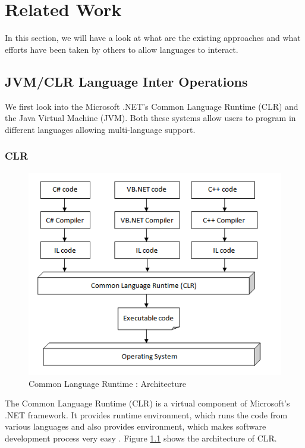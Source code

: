 \chapter{Related Work}
In this section, we will have a look at what are the existing approaches and what efforts
have been taken by others to allow languages to interact.

\section{JVM/CLR Language Inter Operations}

We first look into the Microsoft .NET's Common Language Runtime (CLR) and the Java Virtual Machine (JVM). Both these systems allow users to program in different languages allowing multi-language support. 

\subsection{CLR}

\begin{figure}[h]
	\begin{center}
		\includegraphics[width=\linewidth]{./images/clrArchitecture.png}
	\end{center}
	\caption{Common Language Runtime : Architecture \cite{clrarchitecure}}
	\label{fig:clrarchitecture}
\end{figure}

The Common Language Runtime (CLR) is a virtual component of Microsoft's .NET framework. It provides runtime environment, which runs the code from various languages and also provides environment, which makes software development process very easy \cite{Kennedy:2001:DIG:381694.378797}. Figure \ref{fig:clrarchitecture} shows the architecture of CLR.


